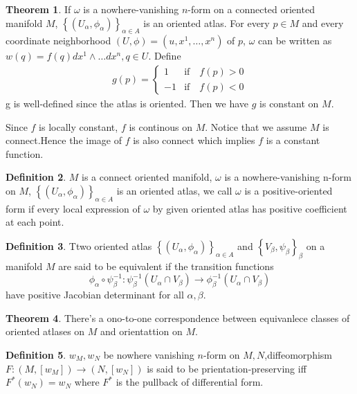 \documentclass[b5paper,12pt]{article}
\newenvironment{prooff}{{\noindent\it\textcolor{black}{Proof}:}\quad}{\par}
\newcommand{\bbrace}[1]{\left\{ #1 \right\} }
\theoremstyle{definition}
\newtheorem{defn}{Definition}[section]
\newtheorem{theo}[defn]{Theorem}
\begin{document}
\begin{theo}
    \label{positive oriented-form}
    If $\omega$ is a nowhere-vanishing $n$-form on a connected oriented manifold $M$, $\bbrace{(U_{\alpha},\phi_{\alpha})}_{\alpha\in A}$ is an oriented atlas. For every $p\in M$ and every coordinate neighborhood $(U,\phi)=(u,x^1,\dots,x^n)$ of $p$, $\omega$ can be
    written as $w(q)=f(q)dx^1\wedge \dots dx^n, q\in U$. Define
    \begin{align}
        g(p)=
        \begin{cases}
            1  & \text{if} \quad f(p)>0 \\
            -1 & \text{if} \quad f(p)<0
        \end{cases}
    \end{align}
    g is well-defined since  the atlas is oriented. Then we have $g$ is constant on $M$.
\end{theo}
\begin{prooff}
    Since $f$ is locally constant, $f$ is continous on $M$. Notice that we assume $M$ is connect.Hence the image of $f$ is also connect which implies $f$ is a constant function.
\end{prooff}
\begin{defn}
    $M$ is a connect oriented manifold, $\omega$ is a nowhere-vanishing n-form on $M$, $\bbrace{(U_{\alpha},\phi_{\alpha})}_{\alpha\in A}$ is an oriented atlas, we call $\omega$ is a positive-oriented form if every local expression of $\omega$
    by given oriented atlas has positive coefficient at each point.
\end{defn}
\begin{defn}
    Ttwo oriented atlas $\bbrace{(U_{\alpha},\phi_{\alpha})}_{\alpha\in A}$ and $\bbrace{V_{\beta},\psi_{\beta}}_{\beta}$ on a manifold $M$ are said to be equivalent if the transition functions
    \begin{equation*}
        \phi_{\alpha}\circ\psi_{\beta}^{-1}:\psi_{\beta}^{-1}(U_{\alpha}\cap V_{\beta})\rightarrow \phi_{\beta}^{-1}(U_{\alpha}\cap V_{\beta})
    \end{equation*}
    have positive Jacobian determinant for all $\alpha,\beta$.
\end{defn}
\begin{theo}
    There's a ono-to-one correspondence between equivanlece classes of oriented atlases on $M$ and orientattion on $M$.
\end{theo}
\begin{defn}
    $w_M,w_N$ be nowhere vanishing $n$-form on $M,N$,diffeomorphism $F:(M,[w_M])\rightarrow (N,[w_N])$ is said to be prientation-preserving iff $F^*(w_N)=w_N$ where $F^*$ is the pullback of differential form.
\end{defn}
\end{document}
